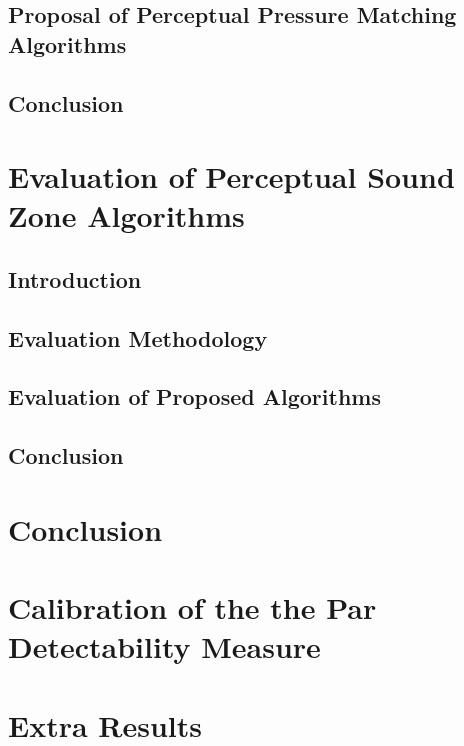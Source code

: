 \documentclass[10pt,twoside,openright,titlepage]{ce}
\begin{document}
\section{Proposal of Perceptual Pressure Matching Algorithms}
\label{ch:perceptual_sound_zone:perceptual_minimization}

\newpage
\section{Conclusion}
\label{ch:perceptual_sound_zone:conclusion}


\chapter{Evaluation of Perceptual Sound Zone Algorithms}
\label{ch:results}
\section{Introduction}
\label{ch:results:introduction}

\newpage
\section{Evaluation Methodology}

\section{Evaluation of Proposed Algorithms}

\newpage
\section{Conclusion}
\label{ch:results:conclusion}


\chapter{Conclusion}




\appendix
\chapter{Calibration of the the Par Detectability Measure}
\label{ch:perceptual:implementation:calibration}

\newpage
\chapter{Extra Results}

\newpage
\end{document}
